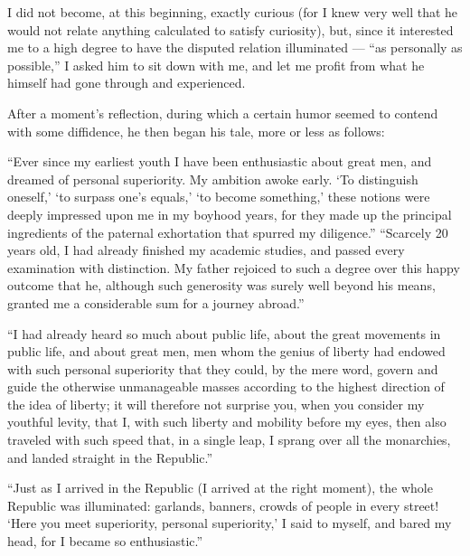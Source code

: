 \documentclass[12pt,a4paper]{book}
\begin{document}
I did not become, at this beginning, exactly curious (for I knew very well that he would not relate anything calculated to satisfy curiosity), but, since it interested me to a high degree to have the disputed relation illuminated --- ``as personally as possible,'' I asked him to sit down with me, and let me profit from what he himself had gone through and experienced.

After a moment's reflection, during which a certain humor seemed to contend with some diffidence, he then began his tale, more or less as follows:

``Ever since my earliest youth I have been enthusiastic about great men, and dreamed of personal superiority. My ambition awoke early. `To distinguish oneself,' `to surpass one's equals,' `to become something,' these notions were deeply impressed upon me in my boyhood years, for they made up the principal ingredients of the paternal exhortation that spurred my diligence.''
``Scarcely 20 years old, I had already finished my academic studies, and passed every examination with distinction. My father rejoiced to such a degree over this
happy outcome that he, although such generosity was surely well beyond his means, granted me a considerable sum for a journey abroad.''

``I had already heard so much about public life, about the great movements in public life, and about great men, men whom the genius of liberty had endowed with such personal superiority that they could, by the mere word, govern and guide the otherwise unmanageable masses according to the highest direction of the idea of liberty; it will therefore not surprise you, when you consider my youthful levity, that I, with such liberty and mobility before my eyes, then also traveled with such speed that, in a single leap, I sprang over all the monarchies, and landed straight in the Republic.''

``Just as I arrived in the Republic (I arrived at the right moment), the whole Republic was illuminated: garlands, banners, crowds of people in every street! `Here you meet superiority, personal superiority,' I said to myself, and bared my head, for I became so enthusiastic.''
\end{document}
